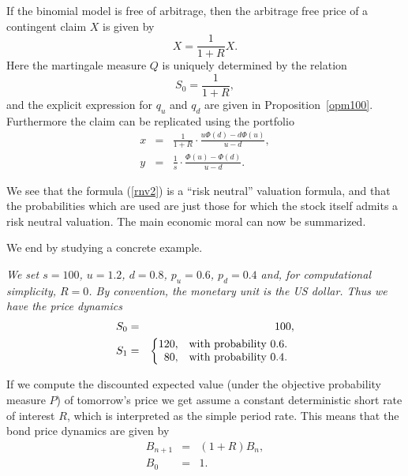 \documentclass{Base}
\begin{document}
\begin{proposition} \label{rnv1}
If the binomial model is free of arbitrage, then the
arbitrage free price of a contingent claim $X$ is given by
\begin{equation} \label{rnv2}
X=\frac{1}{1+R} X.
\end{equation}
Here the martingale measure $Q$ is uniquely determined by the relation
\begin{equation}
\label{rnv3} S_0=\frac{1}{1+R},
\end{equation}
and the explicit expression for $q_u$ and $q_d$ are given in Proposition~\ref{opm100}. Furthermore the claim can be replicated using the portfolio
\begin{eqnarray*}
x&=&\frac{1}{1+R}\cdot \frac{u\Phi (d) -d \Phi (u)}{u-d},\\[5pt]
y&=&\frac{1}{s}\cdot \frac{\Phi (u) - \Phi (d)}{u-d}.
\end{eqnarray*}
\end{proposition}

We see that the formula (\ref{rnv2}) is a ``risk neutral'' valuation
formula, and that the probabilities which are used are just those for which
the stock itself admits a risk neutral valuation. The main economic moral
can now be summarized.

We end by studying a concrete example.

\begin{example}
\emph{We set $s=100$, $u=1.2$, $d=0.8$, $p_u=0.6$, $p_d=0.4$ and, for
computational simplicity, $R=0$. By convention, the monetary unit is the US dollar.
Thus we have the price dynamics}
\begin{eqnarray}
S_0&=&100,\\
S_1&=&
\left\{\begin{array}{@{}r@{}c}
120,&\quad \mbox{{\rm with probability }}0.6.\\
80,&\quad \mbox{{\rm with probability }}0.4.
\end{array}
\right.
\end{eqnarray}
\end{example}

\noindent
If we compute the discounted expected
value (under the objective probability measure $P$) of tomorrow's price  we get
assume a constant deterministic short rate of interest $R$, which is
interpreted as the simple period rate. This means that the bond price
dynamics are given by
\begin{eqnarray}
B_{n+1}&=&(1+R)B_n,\\
B_0&=&1.
\end{eqnarray}
\end{document}
